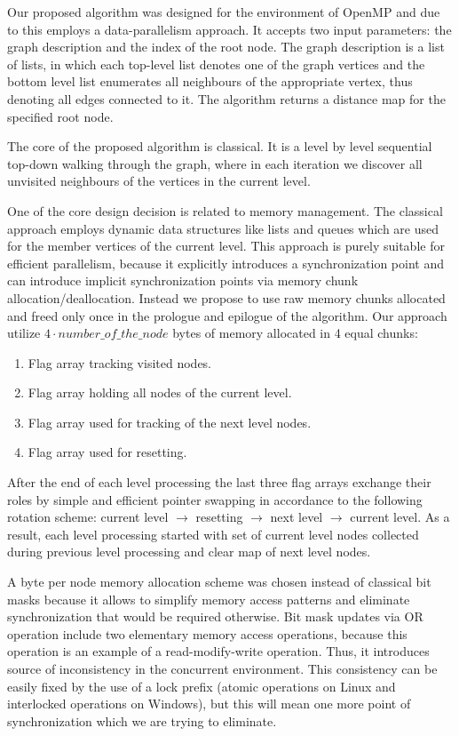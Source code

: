 \documentclass[letterpaper]{article}
\begin{document}
		
		
			Our proposed algorithm was designed for the environment of OpenMP and due to this employs a data-parallelism approach. 
			It accepts two input parameters: the graph description and the index of the root node.
			The graph description is a list of lists, in which each top-level list denotes one of the graph vertices and the bottom level list enumerates all neighbours of the appropriate vertex, thus denoting all edges connected to it.
			The algorithm returns a distance map for the specified root node.
			
			The core of the proposed algorithm is classical. 
			It is a level by level sequential top-down walking through the graph, where in each iteration we discover all unvisited neighbours of the vertices in the current level.
			
			One of the core design decision is related to memory management.
			The classical approach employs dynamic data structures like lists and queues which are used for the member vertices of the current level.
			This approach is purely suitable for efficient parallelism, because it explicitly introduces a synchronization point and can introduce implicit synchronization points via memory chunk allocation/deallocation. 
			Instead we propose to use raw memory chunks allocated and freed only once in the prologue and epilogue of the algorithm.
			Our approach utilize $4 \cdot number\_of\_the\_node$ bytes of memory allocated in 4 equal chunks:
			\begin{enumerate}
				\item Flag array tracking visited nodes.
				\item Flag array holding all nodes of the current level.
				\item Flag array used for tracking of the next level nodes.
				\item Flag array used for resetting.
			\end{enumerate}
			
			After the end of each level processing the last three flag arrays exchange their roles by simple and efficient pointer swapping in accordance to the following rotation scheme: current level $\to$ resetting $\to$ next level $\to$ current level.
			As a result, each level processing started with set of current level nodes collected during previous level processing and clear map of next level nodes. 

			A byte per node memory allocation scheme was chosen instead of classical bit masks because it allows to simplify memory access patterns and eliminate synchronization that would be required otherwise.
			Bit mask updates via OR operation include two elementary memory access operations, because this operation is an example of a read-modify-write operation.
			Thus, it introduces source of inconsistency in the concurrent environment.
			This consistency can be easily fixed by the use of a lock prefix (atomic operations on Linux and interlocked operations on Windows), but this will mean one more point of synchronization which we are trying to eliminate.
			
\end{document}
